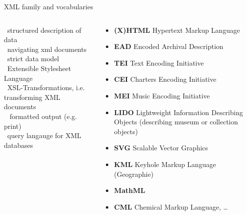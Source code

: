 \begin{frame}{XML family and vocabularies}
\begin{columns}
\footnotesize
{}~structured description of data \\
~navigating xml documents \\
~strict data model \\
~Extensible Stylesheet Language  \\
~XSL-Transformations, i.e. transforming XML documents  \\
~ formatted output (e.g. print) \\
~query langauge for XML databases \\
~
\begin{block}{}
\footnotesize
\begin{itemize}
    \item \textbf{(X)HTML} Hypertext Markup Language 
    \item \textbf{EAD} Encoded Archival Description 
    \item \textbf{TEI} Text Encoding Initiative 
    \item \textbf{CEI} Charters Encoding Initiative 
    \item \textbf{MEI} Music Encoding Initiative 
    \item \textbf{LIDO} Lightweight Information Describing Objects (describing museum or collection objects)
    \item \textbf{SVG} Scalable Vector Graphics 
    \item \textbf{KML} Keyhole Markup Language (Geographie)
    \item \textbf{MathML} 
    \item \textbf{CML} Chemical Markup Language, \dots
\end{itemize}
\end{block}
\end{columns}


\end{frame}




